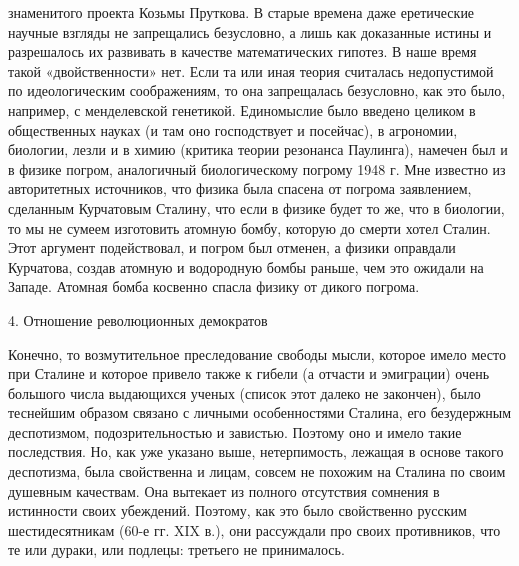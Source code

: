 знаменитого проекта Козьмы Пруткова. В старые времена даже еретические научные
взгляды не запрещались безусловно, а лишь как доказанные истины и разрешалось
их развивать в качестве математических гипотез. В наше время такой
«двойственности» нет. Если та или иная теория считалась недопустимой по
идеологическим соображениям, то она запрещалась безусловно, как это было,
например, с менделевской генетикой. Единомыслие было введено целиком в
общественных науках (и там оно господствует и посейчас), в агрономии, биологии,
лезли и в химию (критика теории резонанса Паулинга), намечен был и в физике
погром, аналогичный биологическому погрому 1948 г. Мне известно из
авторитетных источников, что физика была спасена от погрома заявлением,
сделанным Курчатовым Сталину, что если в физике будет то же, что в биологии, то
мы не сумеем изготовить атомную бомбу, которую до смерти хотел Сталин. Этот
аргумент подействовал, и погром был отменен, а физики оправдали Курчатова,
создав атомную и водородную бомбы раньше, чем это ожидали на Западе. Атомная
бомба косвенно спасла физику от дикого погрома.

4. Отношение революционных демократов

Конечно, то возмутительное преследование свободы мысли, которое имело место при
Сталине и которое привело также к гибели (а отчасти и эмиграции) очень большого
числа выдающихся ученых (список этот далеко не закончен), было теснейшим
образом связано с личными особенностями Сталина, его безудержным деспотизмом,
подозрительностью и завистью. Поэтому оно и имело такие последствия. Но, как
уже указано выше, нетерпимость, лежащая в основе такого деспотизма, была
свойственна и лицам, совсем не похожим на Сталина по своим душевным качествам.
Она вытекает из полного отсутствия сомнения в истинности своих убеждений.
Поэтому, как это было свойственно русским шестидесятникам (60-е гг. XIX в.),
они рассуждали про своих противников, что те или дураки, или подлецы: третьего
не принималось.

